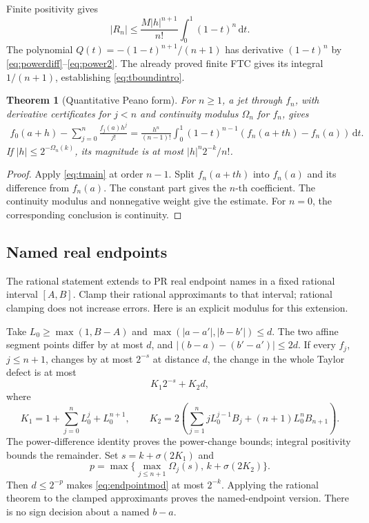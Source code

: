 \documentclass[11pt]{article}
\newtheorem{theorem}{Theorem}[section]
\theoremstyle{definition}
\newcommand{\dd}{\,\mathrm d}
\begin{document}
Finite positivity gives
\[
 |R_n|\le\frac{M|h|^{n+1}}{n!}\int_0^1(1-t)^n\dd t.
\]
The polynomial \(Q(t)=-(1-t)^{n+1}/(n+1)\) has derivative \((1-t)^n\)
by \eqref{eq:powerdiff}--\eqref{eq:power2}. The already proved finite FTC
gives its integral \(1/(n+1)\), establishing \eqref{eq:tboundintro}.

\begin{theorem}[Quantitative Peano form]\label{thm:peano}
For \(n\ge1\), a jet through \(f_n\), with derivative certificates for
\(j<n\) and continuity modulus \(\Omega_n\) for \(f_n\), gives
\begin{align}
 f_0(a+h)-\sum_{j=0}^{n}\frac{f_j(a)h^j}{j!}
 =\frac{h^n}{(n-1)!}\int_0^1(1-t)^{n-1}
                 (f_n(a+th)-f_n(a))\dd t.\label{eq:peano}
\end{align}
If \(|h|\le2^{-\Omega_n(k)}\), its magnitude is at most
\(|h|^n2^{-k}/n!\).
\end{theorem}
\begin{proof}
Apply \eqref{eq:tmain} at order \(n-1\). Split \(f_n(a+th)\) into
\(f_n(a)\) and its difference from \(f_n(a)\). The constant part gives
the \(n\)-th coefficient. The continuity modulus and nonnegative weight
give the estimate. For \(n=0\), the corresponding conclusion is continuity.
\end{proof}

\subsection{Named real endpoints}

The rational statement extends to PR real endpoint names in a fixed
rational interval \([A,B]\). Clamp their rational approximants to that
interval; rational clamping does not increase errors.
Here is an explicit modulus for this extension.

Take \(L_0\ge\max(1,B-A)\) and
\(\max(|a-a'|,|b-b'|)\le d\).
The two affine segment points differ by at most \(d\), and
\(|(b-a)-(b'-a')|\le2d\).
If every \(f_j\), \(j\le n+1\), changes by at most \(2^{-s}\) at distance
\(d\), the change in the whole Taylor defect is at most
\begin{equation}\label{eq:endpointmod}
 K_1 2^{-s}+K_2d,
\end{equation}
where
\[
 K_1=1+\sum_{j=0}^{n}L_0^j+L_0^{n+1},\qquad
 K_2=2\left(\sum_{j=1}^{n}jL_0^{j-1}B_j
                         +(n+1)L_0^nB_{n+1}\right).
\]
The power-difference identity proves the power-change bounds; integral
positivity bounds the remainder. Set \(s=k+\sigma(2K_1)\) and
\[
 p=\max\{\max_{j\le n+1}\Omega_j(s),\,k+\sigma(2K_2)\}.
\]
Then \(d\le2^{-p}\) makes \eqref{eq:endpointmod} at most \(2^{-k}\).
Applying the rational theorem to the clamped approximants proves the
named-endpoint version. There is no sign decision about a named \(b-a\).
\end{document}
